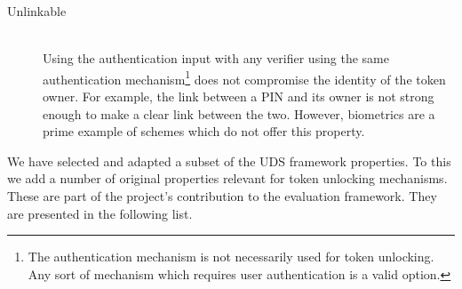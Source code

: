 \begin{description}
  \item[Unlinkable] \hfill \\
  Using the authentication input with any verifier using the same authentication mechanism\footnote{The authentication mechanism is not necessarily used for token unlocking. Any sort of mechanism which requires user authentication is a valid option.} does not compromise the identity of the token owner. For example, the link between a PIN and its owner is not strong enough to make a clear link between the two. However, biometrics are a prime example of schemes which do not offer this property.
  
\end{description}

We have selected and adapted a subset of the UDS framework properties. To this we add a number of original properties relevant for token unlocking mechanisms. These are  part of the project's contribution to the evaluation framework. They are presented in the following list. 

